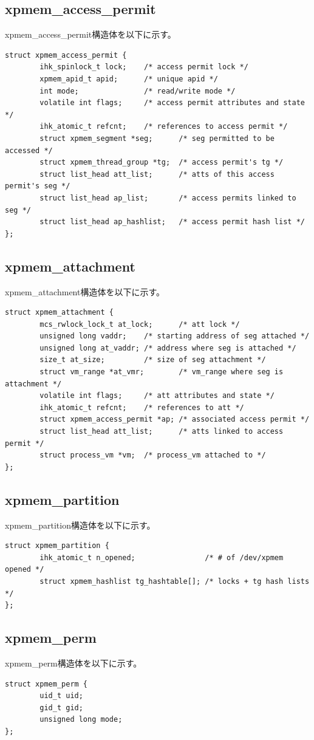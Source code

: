 \documentclass[twoside,11pt,fleqn]{book}
\begin{document}
{\subsection{xpmem\_access\_permit}

xpmem\_access\_permit構造体を以下に示す。
\begin{verbatim}
struct xpmem_access_permit {
        ihk_spinlock_t lock;    /* access permit lock */
        xpmem_apid_t apid;      /* unique apid */
        int mode;               /* read/write mode */
        volatile int flags;     /* access permit attributes and state */
        ihk_atomic_t refcnt;    /* references to access permit */
        struct xpmem_segment *seg;      /* seg permitted to be accessed */
        struct xpmem_thread_group *tg;  /* access permit's tg */
        struct list_head att_list;      /* atts of this access permit's seg */
        struct list_head ap_list;       /* access permits linked to seg */
        struct list_head ap_hashlist;   /* access permit hash list */
};
\end{verbatim}

\subsection{xpmem\_attachment}

xpmem\_attachment構造体を以下に示す。
\begin{verbatim}
struct xpmem_attachment {
        mcs_rwlock_lock_t at_lock;      /* att lock */
        unsigned long vaddr;    /* starting address of seg attached */
        unsigned long at_vaddr; /* address where seg is attached */
        size_t at_size;         /* size of seg attachment */
        struct vm_range *at_vmr;        /* vm_range where seg is attachment */
        volatile int flags;     /* att attributes and state */
        ihk_atomic_t refcnt;    /* references to att */
        struct xpmem_access_permit *ap; /* associated access permit */
        struct list_head att_list;      /* atts linked to access permit */
        struct process_vm *vm;  /* process_vm attached to */
};
\end{verbatim}

\subsection{xpmem\_partition}

xpmem\_partition構造体を以下に示す。
\begin{verbatim}
struct xpmem_partition {
        ihk_atomic_t n_opened;                /* # of /dev/xpmem opened */
        struct xpmem_hashlist tg_hashtable[]; /* locks + tg hash lists */
};
\end{verbatim}

\subsection{xpmem\_perm}

xpmem\_perm構造体を以下に示す。
\begin{verbatim}
struct xpmem_perm {
        uid_t uid;
        gid_t gid;
        unsigned long mode;
};
\end{verbatim}
}
\end{document}
